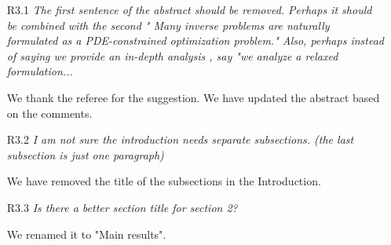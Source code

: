 \documentclass[11pt]{article}
\newcommand{\mycomment}[1]{\textit{\color{bluey}#1}}
\begin{document}
\begin{itemize}
    \item[R3.1] \mycomment{The first sentence of the abstract should be removed. Perhaps it should be combined with the second " Many inverse problems are naturally formulated as a PDE-constrained optimization problem."  Also, perhaps instead of saying we provide an in-depth analysis , say "we analyze a relaxed formulation...}

We thank the referee for the suggestion. We have updated the abstract based on the comments.


\item[R3.2] \mycomment{I am not sure the introduction needs separate subsections. (the last subsection is just one paragraph)}

We have removed the title of the subsections in the Introduction.


\item[R3.3] \mycomment{Is there a better section title for section 2?}

We renamed it to "Main results".

\end{itemize}
\end{document}

